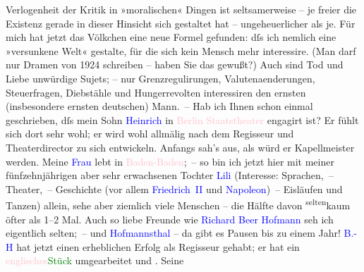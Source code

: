                Verlogenheit der Kritik in »moralischen« Dingen ist seltsamerweise – je freier die
               Existenz gerade in dieser Hinsicht sich gestaltet hat – ungeheuerlicher als je. Für
               mich hat jetzt das Völkchen eine neue Formel gefunden: dſs ich nemlich eine
               »versunkene Welt« gestalte, für die sich kein Mensch mehr interessire. (Man darf nur
               Dramen von 1924 schreiben – haben Sie das gewußt?) Auch sind Tod und
               Liebe unwürdige Sujets; – nur Grenzregulirungen, Valutenaenderungen, Steuerfragen,
               Diebstähle und Hungerrevolten interessiren den {\pb}ernsten (insbesondere ernsten deutschen) Mann. –\pend
           \pstart
           Hab ich Ihnen schon einmal geschrieben, dſs mein Sohn \textcolor{blue}{Heinrich}{}\ledrightnote{\textcolor{blue}{Heinrich Schnitzler}} in \textcolor{pink}{Berlin Staatstheater}{}\ledrightnote{\textcolor{pink}{Schauspielhaus}} engagirt
               ist? Er fühlt sich dort sehr wohl; er wird wohl allmälig nach dem Regisseur und
               Theaterdirector zu sich entwickeln. Anfangs sah's aus, als würd er Kapellmeister
               werden.\pend
           \pstart
           Meine \textcolor{blue}{Frau}{} lebt in \textcolor{pink}{Baden-Baden}{}\ledrightnote{\textcolor{pink}{Baden-Baden}}; – so bin ich jetzt hier mit meiner
               fünfzehnjährigen aber sehr erwachsenen Tochter \textcolor{blue}{Lili}{}\ledrightnote{\textcolor{blue}{Lili Schnitzler}} (Interesse: Sprachen, – Theater, – Geschichte (vor allem \textcolor{blue}{Friedrich II}{}\ledrightnote{\textcolor{blue}{Friedrich II. von Preußen}} und \textcolor{blue}{Napoleon}{}\ledrightnote{\textcolor{blue}{Napoleon Bonaparte}}) – Eisläufen und Tanzen) allein, sehe aber ziemlich viele Menschen
               – die Hälfte davon \substVorne{}\textsuperscript{selten}{\allowbreak}\substDazwischen{}kaum\substHinten{} öfter als 1–2 Mal. Auch so liebe Freunde wie \textcolor{blue}{Richard Beer Hofmann}{}\ledrightnote{\textcolor{blue}{Richard Beer-Hofmann}} seh ich eigentlich selten; – und \textcolor{blue}{Hofmannsthal}{}\ledrightnote{\textcolor{blue}{Hugo von Hofmannsthal}} – da gibt es Pausen bis zu einem Jahr! \textcolor{blue}{B.-H}{}\ledrightnote{\textcolor{blue}{Richard Beer-Hofmann}} hat jetzt einen erheblichen Erfolg als
               Regisseur gehabt; er hat ein \textcolor{pink}{englisches}{}\ledrightnote{\textcolor{pink}{England}}{ }\textcolor{green}{Stück}{} umgearbeitet {\pb}und \label{K_L02423_1v}\label{K_L02423_1h}. Seine
